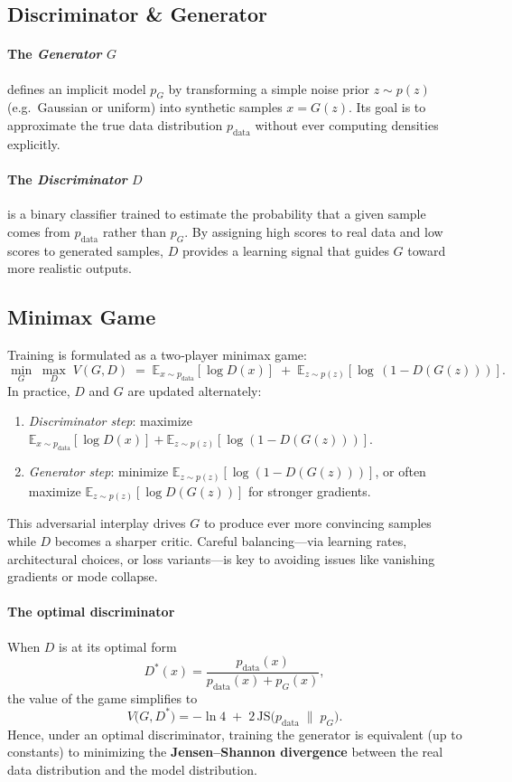 \documentclass{article}
\begin{document}
\subsection{Discriminator \& Generator}
\paragraph{The \emph{Generator} \(G\)} defines an implicit model \(p_G\) by transforming a simple noise prior \(z \sim p(z)\) (e.g.\ Gaussian or uniform) into synthetic samples \(x = G(z)\). Its goal is to approximate the true data distribution \(p_{\mathrm{data}}\) without ever computing densities explicitly.  

\paragraph{The \emph{Discriminator} \(D\)} is a binary classifier trained to estimate the probability that a given sample comes from \(p_{\mathrm{data}}\) rather than \(p_G\). By assigning high scores to real data and low scores to generated samples, \(D\) provides a learning signal that guides \(G\) toward more realistic outputs.  

\subsection{Minimax Game}
Training is formulated as a two‐player minimax game:
\[
  \min_G \;\max_D\; V(G,D)
  \;=\;\mathbb{E}_{x\sim p_{\mathrm{data}}}[\log D(x)]
  \;+\;\mathbb{E}_{z\sim p(z)}[\log\,(1 - D(G(z)))].
\]
In practice, \(D\) and \(G\) are updated alternately:  
\begin{enumerate}
  \item \emph{Discriminator step}: maximize \(\mathbb{E}_{x\sim p_{\mathrm{data}}}[\log D(x)] + \mathbb{E}_{z\sim p(z)}[\log(1 - D(G(z)))]\).  
  \item \emph{Generator step}: minimize \(\mathbb{E}_{z\sim p(z)}[\log(1 - D(G(z)))]\), or often maximize \(\mathbb{E}_{z\sim p(z)}[\log D(G(z))]\) for stronger gradients.  
\end{enumerate}
This adversarial interplay drives \(G\) to produce ever more convincing samples while \(D\) becomes a sharper critic. Careful balancing—via learning rates, architectural choices, or loss variants—is key to avoiding issues like vanishing gradients or mode collapse.  

\paragraph{The optimal discriminator} When \(D\) is at its optimal form
\[
  D^*(x)
  = \frac{p_{\mathrm{data}}(x)}{p_{\mathrm{data}}(x)+p_G(x)},
\]
the value of the game simplifies to
\[
  V\bigl(G,D^*\bigr)
  = -\ln 4 \;+\; 2\,\mathrm{JS}\bigl(p_{\mathrm{data}}\;\|\;p_G\bigr).
\]
Hence, under an optimal discriminator, training the generator is equivalent (up to constants) to minimizing the \textbf{Jensen–Shannon divergence} between the real data distribution and the model distribution.
\end{document}
